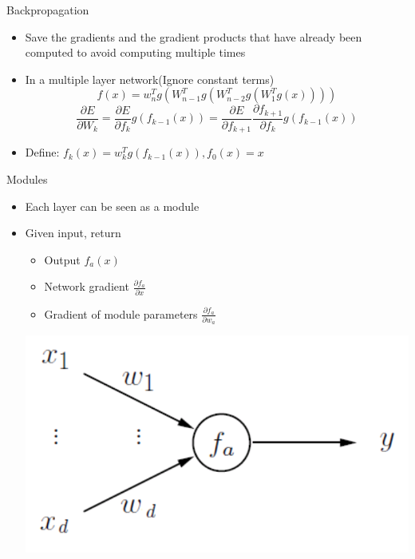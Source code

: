 \documentclass[12pt,notes,mathserif]{beamer}
\newcommand{\bb}[1]{\left( #1 \right)}
\providecommand{\tightlist}{%
	\setlength{\itemsep}{0pt}\setlength{\parskip}{0pt}}
\begin{document}
\begin{frame}{Backpropagation}

\begin{itemize}
\tightlist
\item
  Save the gradients and the gradient products that have already been
  computed to avoid computing multiple times
\item
  In a multiple layer network(Ignore constant terms)\\
  \[f(x)=w_{n}^{T}
  g\bb{  
  W_{n-1}^{T}
  g\bb{
      W_{n-2}^{T}g
      \bb{
          W_{1}^{T}g\bb{x}
      }
  }
  }\] \[
      \frac{\partial E}{\partial W_{k}}=\frac{\partial E}{\partial f_{k}}g(f_{k-1}(x))
      =\frac{\partial E}{\partial f_{k+1}}\frac{\partial f_{k+1}}{\partial f_{k}}g(f_{k-1}(x))
      \]
\item
  Define: \(f_{k}(x)=w_{k}^{T}g(f_{k-1}(x)), f_{0}(x)=x\)
\end{itemize}

\end{frame}

\begin{frame}{Modules}

\begin{itemize}
    \tightlist
    \item Each layer can be seen as a module
    \item Given input, return
            \begin{itemize}
                \tightlist
                \item  Output $f_{a}(x)$
                \item   Network gradient $\frac{\partial f_{a}}{\partial x}$
                \item  Gradient of module parameters $\frac{\partial f_{a}}{\partial w_a}$
            \end{itemize}
            \begin{center}
                \includegraphics[width=.45\textwidth]{2018-04-15-13-09-43.png}
            \end{center}
\end{itemize}

\end{frame}
\end{document}
